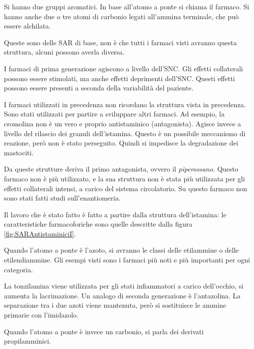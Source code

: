 Si hanno due gruppi aromatici. In base all'atomo a ponte si chiama il
farmaco. Si hanno anche due o tre atomi di carbonio legati all'ammina
terminale, che può essere alchilata.

Queste sono delle SAR di base, non è che tutti i farmaci visti avranno
questa struttura, alcuni possono averla diversa.

I farmaci di prima generazione agiscono a livello dell'SNC. Gli effetti
collaterali possono essere stimolati, ma anche effetti deprimenti
dell'SNC. Questi effetti possono essere presenti a seconda della
variabilità del paziente.

I farmaci utilizzati in precedenza non ricordano la struttura vista in
precedenza. Sono stati utilizzati per partire a sviluppare altri
farmaci.  
Ad esempio, la cromolina non è un vero e proprio antistaminico
(antagonista). Agisce invece a livello del rilascio dei granuli
dell'istamina. Questo è un possibile meccanismo di reazione, però non è
stato perseguito. Quindi si impedisce la degradazione dei mastociti.


Da queste strutture deriva il primo antagonista, ovvero il \emph{piperossano}.
Questo farmaco non è più utilizzato, e la sua struttura non è stata più
utilizzata per gli effetti collaterali intensi, a carico del sistema
circolatorio.
Su questo farmaco non sono stati fatti studi sull'enantiomeria.


Il lavoro che è stato fatto è fatto a partire dalla struttura
dell'istamina: le caratteristiche farmacoforiche sono quelle descritte
dalla figura \ref{fig:SARAntistaminiciI}.

Quando l'atomo a ponte è l'azoto, si avranno le classi delle etilammine o
delle etilendiammine. Gli esempi visti sono i farmaci più noti e più
importanti per ogni categoria.

La tonzilamina viene utilizzata per gli stati infiammatori a carico
dell'occhio, si aumenta la lacrimazione.
Un analogo di seconda generazione è l'antazolina. La separazione tra i due
azoti viene mantenuta, però si sostituisce le ammine primarie con
l'imidazolo.


Quando l'atomo a ponte è invece un carbonio, si parla dei derivati
propilamminici.

